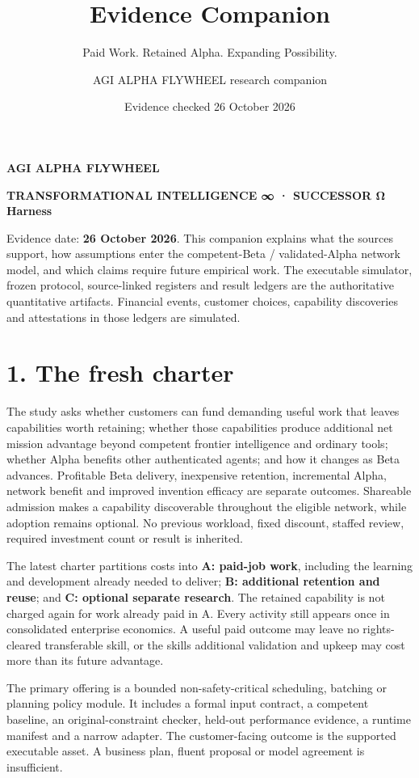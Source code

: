 \documentclass[
  10pt,
]{article}
\title{Evidence Companion}
\subtitle{Paid Work. Retained Alpha. Expanding Possibility.}
\author{AGI ALPHA FLYWHEEL research companion}
\date{Evidence checked 26 October 2026}
\let\studysection\section
\renewcommand{\section}{\Needspace{7\baselineskip}\studysection}
\begin{document}
\maketitle

\textbf{AGI ALPHA FLYWHEEL}

\textbf{TRANSFORMATIONAL INTELLIGENCE ∞ · SUCCESSOR Ω Harness}

Evidence date: \textbf{26 October 2026}. This companion explains what
the sources support, how assumptions enter the competent-Beta /
validated-Alpha network model, and which claims require future empirical
work. The executable simulator, frozen protocol, source-linked registers
and result ledgers are the authoritative quantitative artifacts.
Financial events, customer choices, capability discoveries and
attestations in those ledgers are simulated.

\hypertarget{1-the-fresh-charter}{%
\section{1. The fresh charter}\label{1-the-fresh-charter}}

The study asks whether customers can fund demanding useful work that
leaves capabilities worth retaining; whether those capabilities produce
additional net mission advantage beyond competent frontier intelligence
and ordinary tools; whether Alpha benefits other authenticated agents;
and how it changes as Beta advances. Profitable Beta delivery,
inexpensive retention, incremental Alpha, network benefit and improved
invention efficacy are separate outcomes. Shareable admission makes a
capability discoverable throughout the eligible network, while adoption
remains optional. No previous workload, fixed discount, staffed review,
required investment count or result is inherited.

The latest charter partitions costs into \textbf{A: paid-job work},
including the learning and development already needed to deliver;
\textbf{B: additional retention and reuse}; and \textbf{C: optional
separate research}. The retained capability is not charged again for
work already paid in A. Every activity still appears once in
consolidated enterprise economics. A useful paid outcome may leave no
rights-cleared transferable skill, or the skill\textquotesingle s
additional validation and upkeep may cost more than its future
advantage.

The primary offering is a bounded non-safety-critical scheduling,
batching or planning policy module. It includes a formal input contract,
a competent baseline, an original-constraint checker, held-out
performance evidence, a runtime manifest and a narrow adapter. The
customer-facing outcome is the supported executable asset. A business
plan, fluent proposal or model agreement is insufficient.
\end{document}

